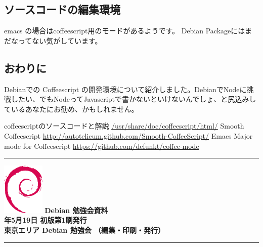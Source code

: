 \documentclass[mingoth,a4paper]{jsarticle}
\newcommand{\debmtgyear}{2012}
\newcommand{\debmtgmonth}{5}
\newcommand{\debmtgdate}{19}
\begin{document}
\subsection{ソースコードの編集環境}

emacs の場合はcoffeescript用のモードがあるようです\cite{coffee-emacs-mode}。
Debian Packageにはまだなってない気がしています。

\subsection{おわりに}

Debianでの Coffeescript の開発環境について紹介しました。DebianでNodeに挑
戦したい、でもNodeってJavascriptで書かないといけないんでしょ、と尻込みし
ているあなたにお勧め、かもしれません。

\begin{thebibliography}{0}
 coffeescriptのソースコードと解説
	\url{/usr/share/doc/coffeescript/html/}
 Smooth Coffeescript
	\url{http://autotelicum.github.com/Smooth-CoffeeScript/}
 Emacs Major mode for Coffeescript
	\url{https://github.com/defunkt/coffee-mode}
\end{thebibliography}


\cleartooddpage

\vspace*{15cm}
\hrule
\vspace{2mm}
\includegraphics[width=2cm]{image200502/openlogo-nd.eps}
\noindent \Large \bf Debian 勉強会資料\\
\noindent \normalfont \debmtgyear{}年\debmtgmonth{}月\debmtgdate{}日 \hspace{5mm}  初版第1刷発行\\
\noindent \normalfont 東京エリア Debian 勉強会 （編集・印刷・発行）\\
\hrule
\end{document}
